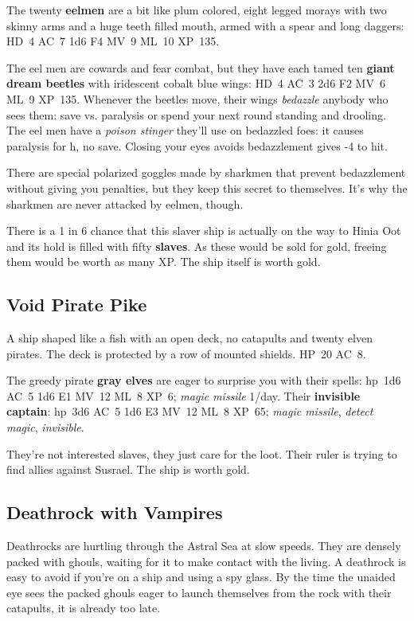 \documentclass[a4paper,serif]{rpg-module}
\begin{document}
The twenty \textbf{eelmen} are a bit like plum colored, eight legged
morays with two skinny arms and a huge teeth filled mouth, armed with
a spear and long daggers: HD~4 AC~7 1d6 F4 MV~9 ML~10 XP~135.

The eel men are cowards and fear combat, but they have each tamed ten
\textbf{giant dream beetles} with iridescent cobalt blue wings: HD~4
AC~3 2d6 F2 MV~6 ML~9 XP~135. Whenever the beetles move, their wings
\textit{bedazzle} anybody who sees them: save vs. paralysis or spend
your next round standing and drooling. The eel men have a
\textit{poison stinger} they'll use on bedazzled foes: it causes
paralysis for \unit[1]{h}, no save. Closing your eyes avoids
bedazzlement gives -4 to hit.

There are special polarized goggles made by sharkmen that prevent
bedazzlement without giving you penalties, but they keep this secret
to themselves. It's why the sharkmen are never attacked by eelmen,
though.

There is a 1 in 6 chance that this slaver ship is actually on the way
to Hinia Oot and its hold is filled with fifty \textbf{slaves}. As
these would be sold for \unit[25,000]{gold}, freeing them would be
worth as many XP. The ship itself is worth \unit[50,000]{gold}.

\subsection{Void Pirate Pike}
\label{sec:void-pirate-pike}

A ship shaped like a fish with an open deck, no catapults and twenty
elven pirates. The deck is protected by a row of mounted shields.
HP~20 AC~8.

The greedy pirate \textbf{gray elves} are eager to surprise you with
their spells: hp~1d6 AC~5 1d6 E1 MV~12 ML~8 XP~6; \emph{magic missile}
1/day. Their \textbf{invisible captain}: hp~3d6 AC~5 1d6 E3 MV~12 ML~8
XP~65; \emph{magic missile}, \emph{detect magic}, \emph{invisible}.

They're not interested slaves, they just care for the loot. Their
ruler is trying to find allies against Susrael. The ship is worth
\unit[20,000]{gold}.

\subsection{Deathrock with Vampires}
\label{sec:vampire-deathrock}

Deathrocks are hurtling through the Astral Sea at slow speeds. They
are densely packed with ghouls, waiting for it to make contact with
the living. A deathrock is easy to avoid if you're on a ship and using
a spy glass. By the time the unaided eye sees the packed ghouls eager
to launch themselves from the rock with their catapults, it is already
too late.
\end{document}
